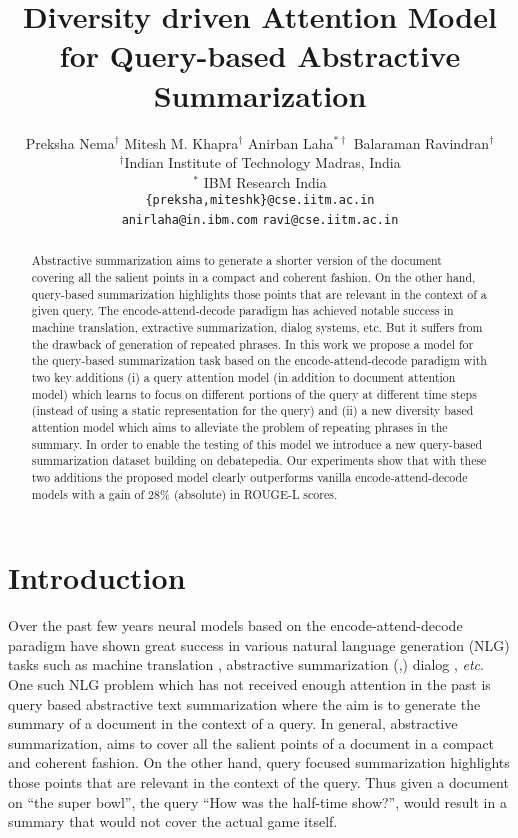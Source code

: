 \documentclass[11pt]{article}
\title{Diversity driven Attention Model for Query-based Abstractive Summarization}
\author{Preksha Nema$^\dagger$ \hspace{0.1cm} Mitesh M. Khapra$^\dagger$ \hspace{0.1cm} Anirban Laha$^{*\dagger}$ \hspace{0.1cm} Balaraman Ravindran$^\dagger$\\
  $^\dagger$Indian Institute of Technology Madras, India \\ 
  $^*$ IBM Research India\\
  {\tt \{preksha,miteshk\}@cse.iitm.ac.in} \\ {\tt anirlaha@in.ibm.com} \hspace{0.1cm}  {\tt ravi@cse.iitm.ac.in} \\}
\date{}
\begin{document}
\fontsize{11.5}{14}\rm
\maketitle
\begin{abstract}

Abstractive summarization aims to generate a shorter version of the document covering all the salient points in a compact and coherent fashion. On the other hand, query-based summarization highlights those points that are relevant in the context of a given query. The encode-attend-decode paradigm has achieved notable success in machine translation, extractive summarization, dialog systems, etc. But it suffers from the drawback of generation of repeated phrases. In this work we propose a model for the query-based summarization task based on the encode-attend-decode paradigm with two key additions (i) a query attention model (in addition to document attention model) which learns to focus on different portions of the query at different time steps (instead of using a static representation for the query) and (ii) a new diversity based attention model which aims to alleviate the problem of repeating phrases in the summary. In order to enable the testing of this model we introduce a new query-based summarization dataset building on debatepedia. Our experiments show that with these two additions the proposed model clearly outperforms vanilla encode-attend-decode models with a gain of 28\% (absolute) in ROUGE-L scores.
\end{abstract}





\section{Introduction}
Over the past few years neural models based on the encode-attend-decode \cite{bahdanau2014neural} paradigm have shown great success in various natural language generation (NLG) tasks such as machine translation \cite{bahdanau2014neural}, abstractive summarization (\cite{rush2015neural},\cite{nallapati2016abstractive}) dialog \cite{li2016persona}, \textit{etc}. One such NLG problem which has not received enough attention in the past is query based abstractive text summarization where the aim is to generate the summary of a document in the context of a query. In general, abstractive summarization, aims to cover all the salient points of a document in a compact and coherent fashion. On the other hand, query focused summarization highlights those points that are relevant in the context of the query. Thus given a document on ``the super bowl'',  the query ``How was the half-time show?'', would result in a summary that would not cover the actual game itself.
\end{document}
